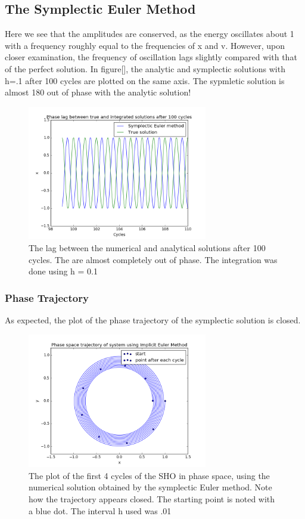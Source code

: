 \documentclass[a4paper]{article}
\begin{document}
\subsection{The Symplectic Euler Method}
Here we see that the amplitudes are conserved, as the energy oscillates about 1 with a frequency roughly equal to the frequencies of x and v. However, upon closer examination, the frequency of oscillation lags slightly compared with that of the perfect solution. In figure[], the analytic and symplectic solutions with h=.1 after 100 cycles are plotted on the same axis. The sypmletic solution is almost 180 out of phase with the analytic solution!

\begin{figure}[H]
\centering
\includegraphics[width=0.7\textwidth]{lag.png}
\caption{\label{fig:lag}The lag between the numerical and analytical solutions after 100 cycles. The are almost completely out of phase. The integration was done using h = 0.1}
\end{figure}


\subsubsection{Phase Trajectory}
As expected, the plot of the phase trajectory of the symplectic solution is closed.


\begin{figure}[H]
\centering
\includegraphics[width=0.7\textwidth]{ph_i.png}
\caption{\label{fig:ph_s}The plot of the first 4 cycles of the SHO in phase space, using the numerical solution obtained by the symplectic Euler method. Note how the trajectory appears closed. The starting point is noted with a blue dot. The interval h used was .01}
\end{figure}
\end{document}
